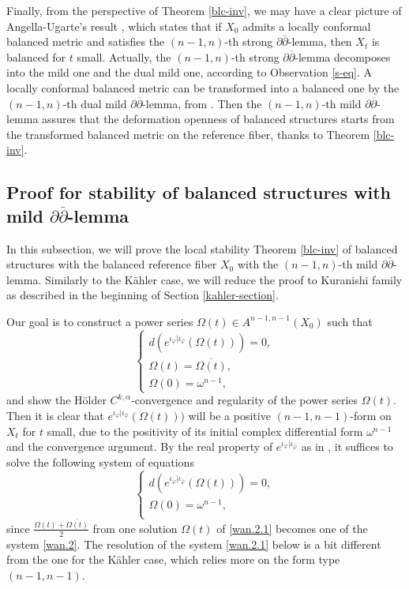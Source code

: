 \documentclass[12pt]{amsart}
\numberwithin{equation}{section}
\renewcommand{\1}{\mathds{1}}
\newcommand{\db}{\overline{\partial}}
\renewcommand{\>}{\rightarrow}
\newcommand{\p}{\partial}
\def\p{\partial}
\def\o{\overline}
\def\b{\bar}
\begin{document}
Finally, from the perspective of Theorem \ref{blc-inv}, we may have
a clear picture of Angella-Ugarte's result \cite[Theorem 4.9]{au},
which states that if $X_0$ admits a locally conformal balanced
metric and satisfies the $(n-1,n)$-th strong $\p\db$-lemma, then
$X_t$ is balanced for $t$ small. Actually, the $(n-1,n)$-th strong
$\p\db$-lemma decomposes into the mild one and the dual mild one,
according to Observation \ref{s-eq}. A locally conformal balanced
metric can be transformed into a balanced one by the $(n-1,n)$-th
dual mild $\p\db$-lemma, from \cite[Theorem 2.5]{AU}. Then the
$(n-1,n)$-th mild $\p\db$-lemma assures that the deformation
openness of balanced structures starts from the transformed balanced
metric on the reference fiber, thanks to Theorem \ref{blc-inv}.


\subsection{Proof for stability of balanced
structures with mild $\p\db$-lemma}\label{proof-bal} In this subsection, we will prove the
local stability Theorem \ref{blc-inv} of balanced structures with
the balanced reference fiber $X_0$ with the $(n-1,n)$-th mild
$\p\b{\p}$-lemma. Similarly to the K\"ahler case, we will reduce the proof to Kuranishi family as described in the beginning of Section \ref{kahler-section}.

Our goal is to construct a power series $\Omega(t)\in
A^{n-1,n-1}(X_0)$ such that
\begin{equation}\label{wan.2}
    \begin{cases}
      d(e^{\iota_{\varphi}|\iota_{\b{\varphi}}}(\Omega(t)))=0,\\
      \Omega(t)=\o{\Omega(t)},\\
      \Omega(0)=\omega^{n-1},
    \end{cases}
\end{equation}
and show the H\"older $C^{k,\alpha}$-convergence and regularity of
the power series $\Omega(t)$. Then it is clear that
$e^{\iota_{\varphi}|\iota_{\b{\varphi}}}(\Omega(t)))$ will be a
positive $(n-1,n-1)$-form on $X_t$ for $t$ small, due to the
positivity of its initial complex differential form $\omega^{n-1}$
and the convergence argument. By the real property of
$e^{\iota_{\varphi}|\iota_{\b{\varphi}}}$ as in \cite[Lemma
$2.8$]{RZ15}, it suffices to solve the following system of equations
\begin{equation}\label{wan.2.1}
    \begin{cases}
      d(e^{\iota_{\varphi}|\iota_{\b{\varphi}}}(\Omega(t)))=0,\\
      \Omega(0)=\omega^{n-1},\\
    \end{cases}
\end{equation}
since $\frac{\Omega(t)+\o{\Omega(t)}}{2}$ from one solution
$\Omega(t)$ of \eqref{wan.2.1} becomes one of the system
\eqref{wan.2}. The resolution of the system \eqref{wan.2.1} below is
a bit different from the one for the K\"ahler case, which relies
more on the form type $(n-1,n-1)$.
\end{document}

